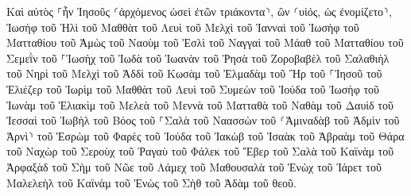 \documentclass[twoside, 9pt]{extreport}
\begin{document}
Καὶ αὐτὸς ⸀ἦν Ἰησοῦς ⸂ἀρχόμενος ὡσεὶ ἐτῶν τριάκοντα⸃, ὢν ⸂υἱός, ὡς ἐνομίζετο⸃, Ἰωσὴφ τοῦ Ἠλὶ 
τοῦ Μαθθὰτ τοῦ Λευὶ τοῦ Μελχὶ τοῦ Ἰανναὶ τοῦ Ἰωσὴφ 
τοῦ Ματταθίου τοῦ Ἀμὼς τοῦ Ναοὺμ τοῦ Ἑσλὶ τοῦ Ναγγαὶ 
τοῦ Μάαθ τοῦ Ματταθίου τοῦ Σεμεῒν τοῦ ⸀Ἰωσὴχ τοῦ Ἰωδὰ 
τοῦ Ἰωανὰν τοῦ Ῥησὰ τοῦ Ζοροβαβὲλ τοῦ Σαλαθιὴλ τοῦ Νηρὶ 
τοῦ Μελχὶ τοῦ Ἀδδὶ τοῦ Κωσὰμ τοῦ Ἐλμαδὰμ τοῦ Ἢρ 
τοῦ ⸀Ἰησοῦ τοῦ Ἐλιέζερ τοῦ Ἰωρὶμ τοῦ Μαθθὰτ τοῦ Λευὶ 
τοῦ Συμεὼν τοῦ Ἰούδα τοῦ Ἰωσὴφ τοῦ Ἰωνὰμ τοῦ Ἐλιακὶμ 
τοῦ Μελεὰ τοῦ Μεννὰ τοῦ Ματταθὰ τοῦ Ναθὰμ τοῦ Δαυὶδ 
τοῦ Ἰεσσαὶ τοῦ Ἰωβὴλ τοῦ Βόος τοῦ ⸀Σαλὰ τοῦ Ναασσὼν 
τοῦ ⸂Ἀμιναδὰβ τοῦ Ἀδμὶν τοῦ Ἀρνὶ⸃ τοῦ Ἑσρὼμ τοῦ Φαρὲς τοῦ Ἰούδα 
τοῦ Ἰακὼβ τοῦ Ἰσαὰκ τοῦ Ἀβραὰμ τοῦ Θάρα τοῦ Ναχὼρ 
τοῦ Σεροὺχ τοῦ Ῥαγαὺ τοῦ Φάλεκ τοῦ Ἔβερ τοῦ Σαλὰ 
τοῦ Καϊνὰμ τοῦ Ἀρφαξὰδ τοῦ Σὴμ τοῦ Νῶε τοῦ Λάμεχ 
τοῦ Μαθουσαλὰ τοῦ Ἑνὼχ τοῦ Ἰάρετ τοῦ Μαλελεὴλ τοῦ Καϊνὰμ 
τοῦ Ἐνὼς τοῦ Σὴθ τοῦ Ἀδὰμ τοῦ θεοῦ. 
\end{document}
